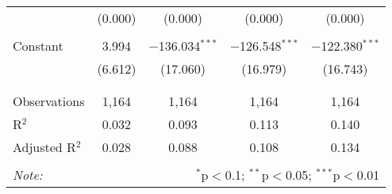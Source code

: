 \begin{table}[!htbp]
\begin{tabular}{@{\extracolsep{-5pt}}lcccc}
  & (0.000) & (0.000) & (0.000) & (0.000) \\ 
  & & & & \\ 
 Constant & 3.994 & $-$136.034$^{***}$ & $-$126.548$^{***}$ & $-$122.380$^{***}$ \\ 
  & (6.612) & (17.060) & (16.979) & (16.743) \\ 
  & & & & \\ 
\hline \\[-1.8ex] 
Observations & 1,164 & 1,164 & 1,164 & 1,164 \\ 
R$^{2}$ & 0.032 & 0.093 & 0.113 & 0.140 \\ 
Adjusted R$^{2}$ & 0.028 & 0.088 & 0.108 & 0.134 \\ 
\hline 
\hline \\[-1.8ex] 
\textit{Note:}  & \multicolumn{4}{r}{$^{*}$p$<$0.1; $^{**}$p$<$0.05; $^{***}$p$<$0.01} \\ 
\end{tabular} 
\end{table} 
